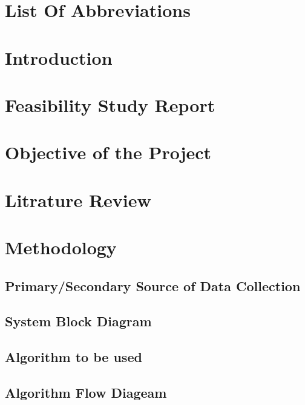 \documentclass{article}
\begin{document}
\listoffigures
\thispagestyle{empty}
\cleardoublepage

\section*{List Of Abbreviations}
\thispagestyle{empty}
\cleardoublepage

\section{Introduction}
\cleardoublepage

\section{Feasibility Study Report}
\cleardoublepage

\section{Objective of the Project}
\cleardoublepage

\section{Litrature Review}
\cleardoublepage

\section{Methodology}
\cleardoublepage

\subsection{Primary/Secondary Source of Data Collection}
\cleardoublepage

\subsection{System Block Diagram}
\cleardoublepage

\subsection{Algorithm to be used}
\cleardoublepage

\subsection{Algorithm Flow Diageam}
\cleardoublepage
\end{document}
